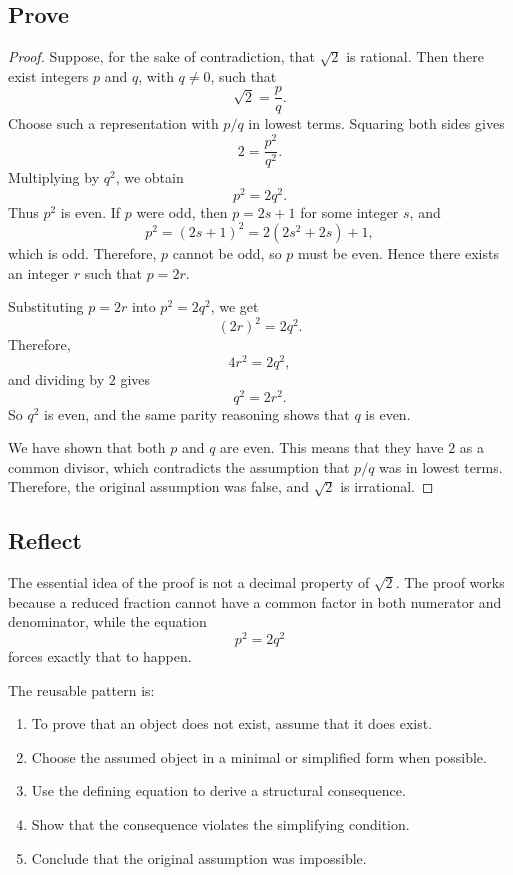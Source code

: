 \documentclass[11pt,a4paper]{article}
\begin{document}
\subsection{Prove}

\begin{proof}
Suppose, for the sake of contradiction, that \(\sqrt{2}\) is rational. Then there exist integers \(p\) and \(q\), with \(q \neq 0\), such that
\[
    \sqrt{2} = \frac{p}{q}.
\]
Choose such a representation with \(p/q\) in lowest terms. Squaring both sides gives
\[
    2 = \frac{p^2}{q^2}.
\]
Multiplying by \(q^2\), we obtain
\[
    p^2 = 2q^2.
\]
Thus \(p^2\) is even. If \(p\) were odd, then \(p = 2s + 1\) for some integer \(s\), and
\[
    p^2 = (2s + 1)^2 = 2(2s^2 + 2s) + 1,
\]
which is odd. Therefore, \(p\) cannot be odd, so \(p\) must be even. Hence there exists an integer \(r\) such that \(p = 2r\).

Substituting \(p = 2r\) into \(p^2 = 2q^2\), we get
\[
    (2r)^2 = 2q^2.
\]
Therefore,
\[
    4r^2 = 2q^2,
\]
and dividing by \(2\) gives
\[
    q^2 = 2r^2.
\]
So \(q^2\) is even, and the same parity reasoning shows that \(q\) is even.

We have shown that both \(p\) and \(q\) are even. This means that they have \(2\) as a common divisor, which contradicts the assumption that \(p/q\) was in lowest terms. Therefore, the original assumption was false, and \(\sqrt{2}\) is irrational.
\end{proof}

\subsection{Reflect}

The essential idea of the proof is not a decimal property of \(\sqrt{2}\). The proof works because a reduced fraction cannot have a common factor in both numerator and denominator, while the equation
\[
    p^2 = 2q^2
\]
forces exactly that to happen.

The reusable pattern is:

\begin{enumerate}[label=\arabic*., leftmargin=*]
    \item To prove that an object does not exist, assume that it does exist.
    \item Choose the assumed object in a minimal or simplified form when possible.
    \item Use the defining equation to derive a structural consequence.
    \item Show that the consequence violates the simplifying condition.
    \item Conclude that the original assumption was impossible.
\end{enumerate}
\end{document}
